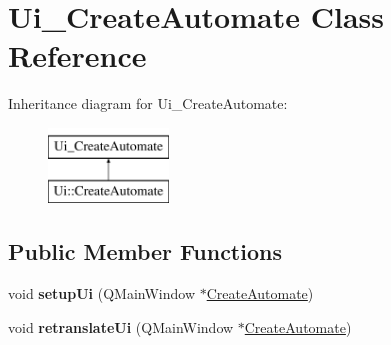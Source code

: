 \hypertarget{class_ui___create_automate}{\section{Ui\-\_\-\-Create\-Automate Class Reference}
\label{class_ui___create_automate}
}
Inheritance diagram for Ui\-\_\-\-Create\-Automate\-:\begin{figure}[H]
\begin{center}
\leavevmode
\includegraphics[height=2.000000cm]{class_ui___create_automate}
\end{center}
\end{figure}
\subsection*{Public Member Functions}
\begin{DoxyCompactItemize}
\item 
\hypertarget{class_ui___create_automate_adc1c604839808d7f0699c4c2075d119c}{void {\bfseries setup\-Ui} (Q\-Main\-Window $\ast$\hyperlink{class_create_automate}{Create\-Automate})}\label{class_ui___create_automate_adc1c604839808d7f0699c4c2075d119c}

\item 
\hypertarget{class_ui___create_automate_ac995057d86d1b7fd1f805ea116112e82}{void {\bfseries retranslate\-Ui} (Q\-Main\-Window $\ast$\hyperlink{class_create_automate}{Create\-Automate})}\label{class_ui___create_automate_ac995057d86d1b7fd1f805ea116112e82}

\end{DoxyCompactItemize}

